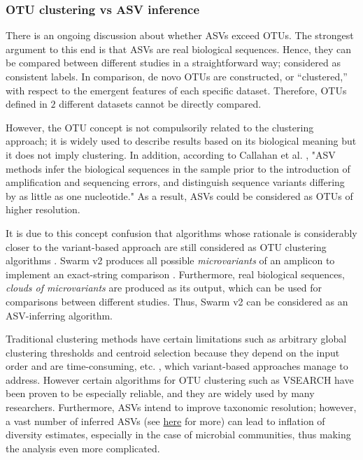    \subsubsection*{OTU clustering vs ASV inference}

   There is an ongoing discussion about whether ASVs exceed OTUs. 
   The strongest argument to this end is that ASVs are real biological sequences. 
   Hence, they can be compared between different studies in a straightforward way; 
   considered as consistent labels. 
   In comparison, de novo OTUs are constructed, or “clustered,” with respect to the emergent features of each specific dataset. 
   Therefore, OTUs defined in $2$ different datasets cannot be directly compared.

   However, the OTU concept is not compulsorily related to the clustering approach; 
   it is widely used to describe results based on its biological meaning but it does not imply clustering. 
   In addition, according to Callahan et al. \citep{callahan2017exact}, "ASV methods infer the biological sequences in the sample prior to the introduction of amplification and sequencing errors, and distinguish sequence variants differing by as little as one nucleotide." 
   As a result, ASVs could be considered as OTUs of higher resolution.

   It is due to this concept confusion that algorithms whose rationale is considerably closer to the variant-based approach are still considered as OTU clustering algorithms \citep{callahan2017exact}. 
   Swarm v2 produces all possible \textit{microvariants} of an amplicon to implement an exact-string comparison \citep{mahe2015swarm}. 
   Furthermore, real biological sequences, \textit{clouds of microvariants} are produced as its output, which can be used for comparisons between different studies. Thus, Swarm v2 can be considered as an ASV-inferring algorithm.

   Traditional clustering methods have certain limitations such as arbitrary global clustering thresholds and centroid selection because they depend on the input order and are time-consuming, etc. \citep{mahe2014swarm}, which variant-based approaches manage to address. 
   However certain algorithms for OTU clustering such as VSEARCH have been proven to be especially reliable, and they are widely used by many researchers. 
   Furthermore, ASVs intend to improve taxonomic resolution; however, a vast number of inferred ASVs (see \href{http://fiererlab.org/2017/05/02/lumping-versus-splitting-is-it-time-for-microbial-ecologists-to-abandon-otus/}{here} for more) can lead to inflation of diversity estimates, especially in the case of microbial communities, thus making the analysis even more complicated.

